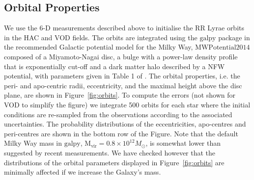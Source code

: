 \documentclass[fleqn,usenatbib]{mnras}
\begin{document}
\subsection{Orbital Properties}
   
We use the 6-D measurements described above to initialise the RR Lyrae
orbits in the HAC and VOD fields. The orbits are integrated using the
$\mathrm{galpy}$ package \citep{Bovy2015} in the recommended Galactic
potential model for the Milky Way, $\mathrm{MWPotential2014}$ composed
of a Miyamoto-Nagai disc, a bulge with a power-law density profile
that is exponentially cut-off and a dark matter halo described by a
NFW potential, with parameters given in Table 1 of
\citet{Bovy2015}. The orbital properties, i.e. the peri- and
apo-centric radii, eccentricity, and the maximal height above the disc
plane, are shown in Figure~\ref{fig:orbits}. To compute the errors
(not shown for VOD to simplify the figure) we integrate 500 orbits for
each star where the initial conditions are re-sampled from the
observations according to the associated uncertainties. The
probability distributions of the eccentricities, apo-centres and
peri-centres are shown in the bottom row of the Figure. Note that the
default Milky Way mass in $\mathrm{galpy}$, $\mathrm{M_{vir}} = 0.8
\times 10^{12} M_{\odot}$, is somewhat lower than suggested by recent
measurements.  We have checked however that the distributions of the
orbital parameters displayed in Figure~\ref{fig:orbits} are minimally
affected if we increase the Galaxy's mass.
\end{document}
